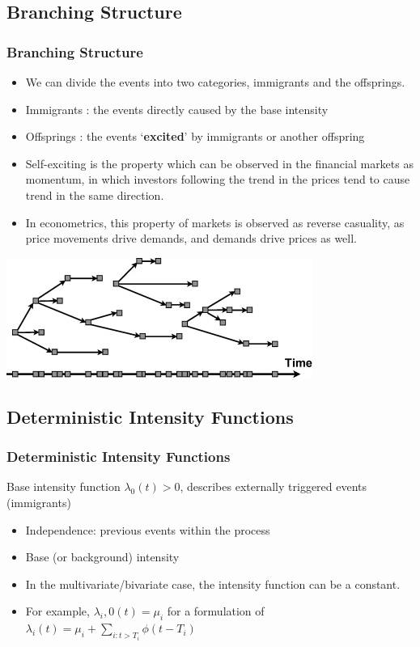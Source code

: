 \documentclass{beamer}
\begin{document}
\subsection{Branching Structure}
\begin{frame}
\frametitle{Branching Structure}
\begin{itemize}
	\item We can divide the events into two categories, immigrants and the offsprings.
	\item Immigrants : the events directly caused by the base intensity
	\item Offsprings : the events `\textbf{excited}' by immigrants or another offspring
	\item Self-exciting is the property which can be observed in the financial markets as momentum, in which investors following the trend in the prices tend to cause trend in the same direction.
	\item In econometrics, this property of markets is observed as reverse casuality, as price movements drive demands, and demands drive prices as well.
\end{itemize}

\begin{center}
	\includegraphics[scale=0.5]{image/branching_1}
\end{center}

\end{frame}

\subsection{Deterministic Intensity Functions}
\begin{frame}
\frametitle{Deterministic Intensity Functions}
Base intensity function $\lambda_0(t)>0$, describes externally triggered events (immigrants)
\begin{itemize}
	\item Independence: previous events within the process
	\item Base (or background) intensity
	\item In the multivariate/bivariate case, the intensity function can be a constant.
	\item For example, $\lambda_i,0(t) = \mu_i$ for a formulation of $\lambda_i(t) = \mu_i + \sum_{i: t > T_i} \phi(t - T_i)$
\end{itemize}
\end{frame}
\end{document}
